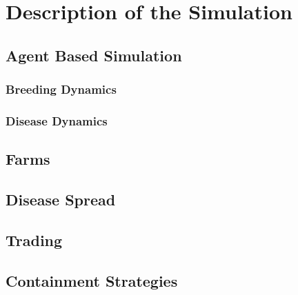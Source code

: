 \chapter{Description of the Simulation}
\section{Agent Based Simulation}
\subsection{Breeding Dynamics}
\subsection{Disease Dynamics}
\section{Farms}
\section{Disease Spread}
\section{Trading}
\section{Containment Strategies}
